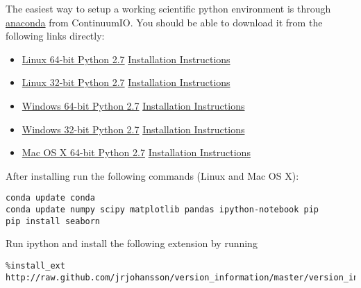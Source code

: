     The easiest way to setup a working scientific python environment is
through \href{http://continuum.io/downloads}{anaconda} from ContinuumIO.
You should be able to download it from the following links directly:

\begin{itemize}
\itemsep1pt\parskip0pt
\item
  \href{http://09c8d0b2229f813c1b93-c95ac804525aac4b6dba79b00b39d1d3.r79.cf1.rackcdn.com/Anaconda-2.1.0-Linux-x86_64.sh}{Linux
  64-bit Python 2.7}
  \href{http://docs.continuum.io/anaconda/install.html\#linux-install}{Installation
  Instructions}
\item
  \href{http://09c8d0b2229f813c1b93-c95ac804525aac4b6dba79b00b39d1d3.r79.cf1.rackcdn.com/Anaconda-2.1.0-Linux-x86.sh}{Linux
  32-bit Python 2.7}
  \href{http://docs.continuum.io/anaconda/install.html\#linux-install}{Installation
  Instructions}
\item
  \href{http://09c8d0b2229f813c1b93-c95ac804525aac4b6dba79b00b39d1d3.r79.cf1.rackcdn.com/Anaconda-2.1.0-Windows-x86_64.exe}{Windows
  64-bit Python 2.7}
  \href{http://docs.continuum.io/anaconda/install.html\#windows-install}{Installation
  Instructions}
\item
  \href{http://09c8d0b2229f813c1b93-c95ac804525aac4b6dba79b00b39d1d3.r79.cf1.rackcdn.com/Anaconda-2.1.0-Windows-x86.exe}{Windows
  32-bit Python 2.7}
  \href{http://docs.continuum.io/anaconda/install.html\#windows-install}{Installation
  Instructions}
\item
  \href{http://09c8d0b2229f813c1b93-c95ac804525aac4b6dba79b00b39d1d3.r79.cf1.rackcdn.com/Anaconda-2.1.0-MacOSX-x86_64.sh}{Mac
  OS X 64-bit Python 2.7}
  \href{http://docs.continuum.io/anaconda/install.html\#mac-install}{Installation
  Instructions}
\end{itemize}

After installing run the following commands (Linux and Mac OS X):

\begin{verbatim}
conda update conda
conda update numpy scipy matplotlib pandas ipython-notebook pip
pip install seaborn
\end{verbatim}

    Run ipython and install the following extension by running

\begin{verbatim}
%install_ext http://raw.github.com/jrjohansson/version_information/master/version_information.py
\end{verbatim}

